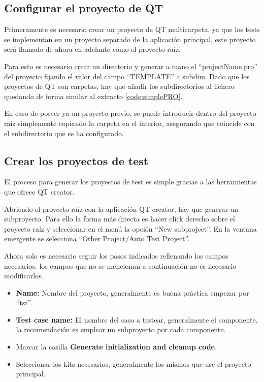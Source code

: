 \subsection{Configurar el proyecto de QT}

Primeramente es necesario crear un proyecto de QT multicarpeta, ya que los tests se implementan en un proyecto separado de la aplicación principal, este proyecto será llamado de ahora en adelante como el proyecto raíz.

Para esto es necesario crear un directorio y generar a mano el ``projectName.pro'' del proyecto fijando el valor del campo ``TEMPLATE'' a subdirs. Dado que los proyectos de QT son carpetas, hay que añadir los subdirectorios al fichero quedando de forma similar al extracto \ref{code:simplePRO}.


En caso de poseer ya un proyecto previo, se puede introducir dentro del proyecto raíz simplemente copiando la carpeta en el interior, asegurando que coincide con el subdirectorio que se ha configurado.

\subsection{Crear los proyectos de test}

El proceso para generar los proyectos de test es simple gracias a las herramientas que ofrece QT creator.

Abriendo el proyecto raíz con la aplicación QT creator, hay que generar un subproyecto. Para ello la forma más directa es hacer click derecho sobre el proyecto raíz y seleccionar en el menú la opción ``New subproject''. En la ventana emergente se selecciona ``Other Project/Auto Test Project''.

Ahora solo es necesario seguir los pasos indicados rellenando los campos necesarios. los campos que no se mencionan a continuación no es necesario modificarlos.

\begin{itemize}
    \item \textbf{Name:} Nombre del proyecto, generalmente es buena práctica empezar por ``tst''.
    \item \textbf{Test case name:} El nombre del caso a testear, generalmente el componente, la recomendación es emplear un subproyecto por cada componente.
    \item Marcar la casilla \textbf{Generate initialization and cleanup code}.
    \item Seleccionar los kits necesarios, generalmente los mismos que use el proyecto principal.
\end{itemize}

